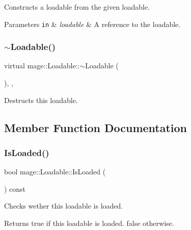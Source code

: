Constructs a loadable from the given loadable.


\begin{DoxyParams}[1]{Parameters}
\mbox{\tt in}  & {\em loadable} & A reference to the loadable. \\
\hline
\end{DoxyParams}
\hypertarget{classmage_1_1_loadable_a7f51b5e1065ebe4dd1da7ef9c9966546}{}\label{classmage_1_1_loadable_a7f51b5e1065ebe4dd1da7ef9c9966546} 
\subsubsection{\texorpdfstring{$\sim$\+Loadable()}{~Loadable()}}
{\footnotesize\ttfamily virtual mage\+::\+Loadable\+::$\sim$\+Loadable (\begin{DoxyParamCaption}{ }\end{DoxyParamCaption})\hspace{0.3cm}{\ttfamily [protected]}, {\ttfamily [virtual]}, {\ttfamily [default]}}

Destructs this loadable. 

\subsection{Member Function Documentation}
\hypertarget{classmage_1_1_loadable_a53cfa5beb9b44bbcda0d6166a54b8cb6}{}\label{classmage_1_1_loadable_a53cfa5beb9b44bbcda0d6166a54b8cb6} 
\subsubsection{\texorpdfstring{Is\+Loaded()}{IsLoaded()}}
{\footnotesize\ttfamily bool mage\+::\+Loadable\+::\+Is\+Loaded (\begin{DoxyParamCaption}{ }\end{DoxyParamCaption}) const}

Checks wether this loadable is loaded.

\begin{DoxyReturn}{Returns}
{\ttfamily true} if this loadable is loaded. {\ttfamily false} otherwise. 
\end{DoxyReturn}
\hypertarget{classmage_1_1_loadable_a82277616525b6ed9b1e19fd2dcdb4c0d}{}\label{classmage_1_1_loadable_a82277616525b6ed9b1e19fd2dcdb4c0d} 

